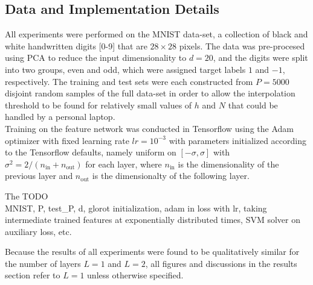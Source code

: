 \documentclass[11pt]{article}
\begin{document}


\subsection{Data and Implementation Details}

All experiments were performed on the MNIST data-set, a collection of black and white handwritten digits [0-9] that are $28\times28$ pixels. The data was pre-procesed using PCA to reduce the input dimensionality to $d=20$, and the digits were split into two groups, even and odd, which were assigned target labels $1$ and $-1$, respectively. The training and test sets were each constructed from $P=5000$ disjoint random samples of the full data-set in order to allow the interpolation threshold to be found for relatively small values of $h$ and $N$ that could be handled by a personal laptop.\\

Training on the feature network was conducted in Tensorflow \cite{abadiTensorFlowLargeScaleMachine} using the Adam optimizer with fixed learning rate $lr=10^{-3}$ with parameters initialized according to the Tensorflow defaults, namely uniform on $[-\sigma, \sigma]$ with $\sigma^2 = 2 /(n_\text{in} + n_\text{out})$ for each layer, where $n_\text{in}$ is the dimensionality of the previous layer and $n_\text{out}$ is the dimensionalty of the following layer.

The 
TODO \\

MNIST, P, test\_P, d, glorot initialization, adam in loss with lr, taking intermediate trained features at exponentially distributed times, SVM solver on auxiliary loss, etc.

Because the results of all experiments were found to be qualitatively similar for the number of layers $L=1$ and $L=2$, all figures and discussions in the results section refer to $L=1$ unless otherwise specified. 
\end{document}
